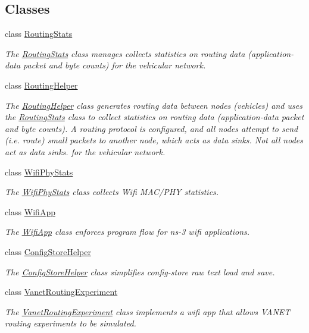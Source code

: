\subsection*{Classes}
\begin{DoxyCompactItemize}
\item 
class \hyperlink{classRoutingStats}{Routing\+Stats}
\begin{DoxyCompactList}\small\item\em The \hyperlink{classRoutingStats}{Routing\+Stats} class manages collects statistics on routing data (application-\/data packet and byte counts) for the vehicular network. \end{DoxyCompactList}\item 
class \hyperlink{classRoutingHelper}{Routing\+Helper}
\begin{DoxyCompactList}\small\item\em The \hyperlink{classRoutingHelper}{Routing\+Helper} class generates routing data between nodes (vehicles) and uses the \hyperlink{classRoutingStats}{Routing\+Stats} class to collect statistics on routing data (application-\/data packet and byte counts). A routing protocol is configured, and all nodes attempt to send (i.\+e. route) small packets to another node, which acts as data sinks. Not all nodes act as data sinks. for the vehicular network. \end{DoxyCompactList}\item 
class \hyperlink{classWifiPhyStats}{Wifi\+Phy\+Stats}
\begin{DoxyCompactList}\small\item\em The \hyperlink{classWifiPhyStats}{Wifi\+Phy\+Stats} class collects Wifi M\+A\+C/\+P\+HY statistics. \end{DoxyCompactList}\item 
class \hyperlink{classWifiApp}{Wifi\+App}
\begin{DoxyCompactList}\small\item\em The \hyperlink{classWifiApp}{Wifi\+App} class enforces program flow for ns-\/3 wifi applications. \end{DoxyCompactList}\item 
class \hyperlink{classConfigStoreHelper}{Config\+Store\+Helper}
\begin{DoxyCompactList}\small\item\em The \hyperlink{classConfigStoreHelper}{Config\+Store\+Helper} class simplifies config-\/store raw text load and save. \end{DoxyCompactList}\item 
class \hyperlink{classVanetRoutingExperiment}{Vanet\+Routing\+Experiment}
\begin{DoxyCompactList}\small\item\em The \hyperlink{classVanetRoutingExperiment}{Vanet\+Routing\+Experiment} class implements a wifi app that allows V\+A\+N\+ET routing experiments to be simulated. \end{DoxyCompactList}\end{DoxyCompactItemize}
